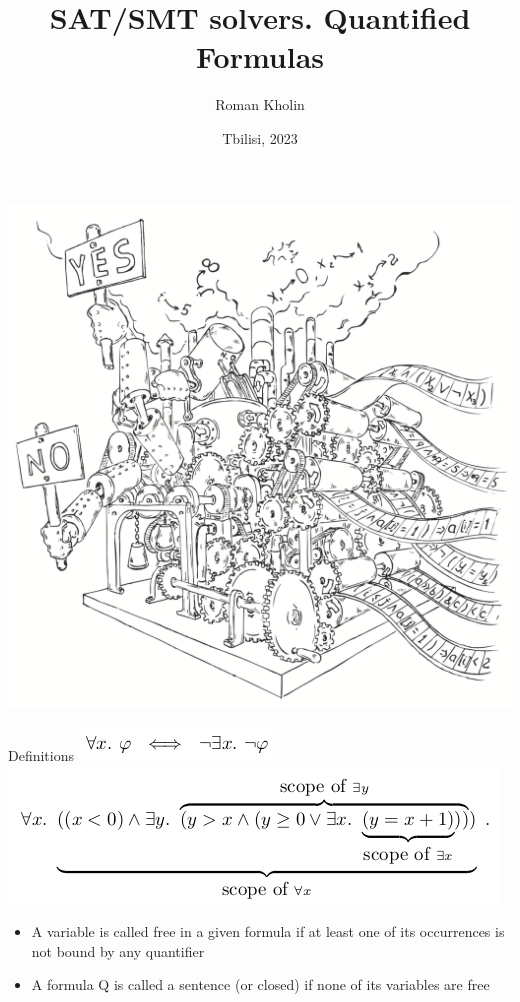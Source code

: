 \documentclass{beamer}
\begin{document}
\title{SAT/SMT solvers. Quantified Formulas}
\author{Roman Kholin}
\date{Tbilisi, 2023}

\begin{frame}
\includegraphics[scale=0.5]{../decision-procedure.png}
\end{frame}

\frame{\titlepage}

\begin{frame}{Definitions}
\includegraphics[scale=0.5]{all_and_exist.png}\newline
\includegraphics[scale=0.5]{scope.png}\newline
\begin{block}{}
\begin{itemize}
\item A variable is called free in a given formula if at least one of its occurrences is not bound by any quantifier
\item A formula Q is called a sentence (or closed) if none of its variables are free
\end{itemize}
\end{block}
\end{frame}
\end{document}
